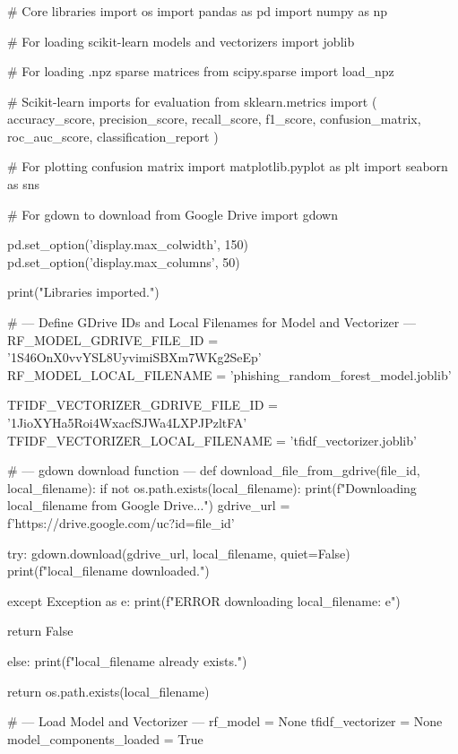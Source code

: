 \subsubsection*{}

\begin{ffcode}
# Core libraries
import os
import pandas as pd
import numpy as np

# For loading scikit-learn models and vectorizers
import joblib

# For loading .npz sparse matrices
from scipy.sparse import load_npz

# Scikit-learn imports for evaluation
from sklearn.metrics import (
    accuracy_score,
    precision_score,
    recall_score,
    f1_score,
    confusion_matrix,
    roc_auc_score,
    classification_report
)

# For plotting confusion matrix
import matplotlib.pyplot as plt
import seaborn as sns

# For gdown to download from Google Drive
import gdown

pd.set_option('display.max_colwidth', 150)
pd.set_option('display.max_columns', 50)

print("Libraries imported.")

# --- Define GDrive IDs and Local Filenames for Model and Vectorizer ---
RF_MODEL_GDRIVE_FILE_ID = '1S46OnX0vvYSL8UyvimiSBXm7WKg2SeEp'
RF_MODEL_LOCAL_FILENAME = 'phishing_random_forest_model.joblib'

TFIDF_VECTORIZER_GDRIVE_FILE_ID = '1JioXYHa5Roi4WxacfSJWa4LXPJPzltFA'
TFIDF_VECTORIZER_LOCAL_FILENAME = 'tfidf_vectorizer.joblib'

# --- gdown download function ---
def download_file_from_gdrive(file_id, local_filename):
    if not os.path.exists(local_filename):
        print(f"Downloading {local_filename} from Google Drive...")
        gdrive_url = f'https://drive.google.com/uc?id={file_id}'

        try:
            gdown.download(gdrive_url, local_filename, quiet=False)
            print(f"{local_filename} downloaded.")

        except Exception as e:
            print(f"ERROR downloading {local_filename}: {e}")

        return False

    else:
        print(f"{local_filename} already exists.")

    return os.path.exists(local_filename)

# --- Load Model and Vectorizer ---
rf_model = None
tfidf_vectorizer = None
model_components_loaded = True


\end{ffcode}

